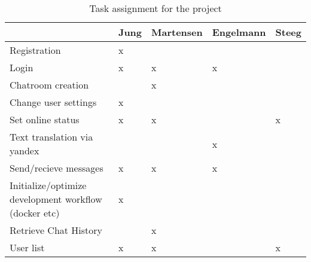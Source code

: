 \documentclass[]{scrartcl}
\begin{document}
\noindent
\renewcommand{\arraystretch}{1.5}
\renewcommand{\check}{x}
\begin{table}
\begin{tabularx}{\textwidth}{p{}XXXX}

    & \textbf{Jung} & \textbf{Martensen} & \textbf{Engelmann} & \textbf{Steeg} \\\hline\hline
Registration & \check & & &  \\ \hline
Login & \check & \check & \check & \\\hline
Chatroom creation & & \check & & \\\hline
Change user settings &  \check & & & \\\hline
Set online status & \check & \check & & \check\\\hline
Text translation via yandex & & & \check & \\\hline
Send/recieve messages & \check & \check & \check & \\\hline
Initialize/optimize development workflow (docker etc) & \check & & & \\\hline
Retrieve Chat History & & \check & & \\\hline
User list & \check & \check & & \check \\\hline
\end{tabularx}
\caption{Task assignment for the project}\label{table:task-assignment}
\end{table}
\end{document}
